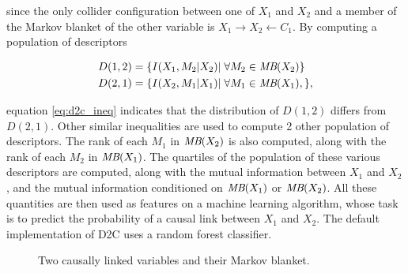 since the only collider configuration between one of $X_1$ and $X_2$ and a
member of the Markov blanket of the other variable is $X_1\rightarrow
X_2\leftarrow C_1$. By computing a population of descriptors

\begin{align}
    D(1, 2)&=\{I(X_1, M_2 | X_2)|\;\forall M_2\in\textit{MB}(X_2)\}\\
    D(2, 1)&=\{I(X_2, M_1 | X_1)|\;\forall M_1\in\textit{MB}(X_1),\},
\end{align}

equation \ref{eq:d2c_ineq} indicates that the distribution of $D(1, 2)$ differs
from $D(2, 1)$. Other similar inequalities are used to compute 2 other
population of descriptors. The rank of each $M_1$ in $\textit{MB}(X_2)$ is also
computed, along with the rank of each $M_2$ in $\textit{MB}(X_1)$. The quartiles of the
population of these various descriptors are computed, along with the
mutual information between $X_1$ and $X_2$, and the mutual information
conditioned on $\textit{MB}(X_1)$ or $\textit{MB}(X_2)$. All these quantities are then used as
features on a machine learning algorithm, whose task is to predict the
probability of a causal link between $X_1$ and $X_2$. The default implementation
of D2C uses a random forest classifier.

\begin{figure}
    \centering
    \caption{Two causally linked variables and their Markov blanket.}
    \label{fig:d2c_mb}
\end{figure}

